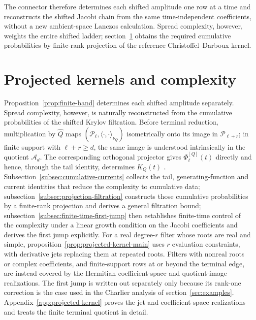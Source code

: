 \documentclass[a4paper,11pt]{article}
\theoremstyle{definition}
\theoremstyle{remark}
\newcommand{\cA}{\mathcal A}
\newcommand{\cP}{\mathcal P}
\newcommand{\Qhat}{\widehat Q}
\begin{document}
The connector therefore determines each shifted amplitude one row at a time and reconstructs the shifted Jacobi chain from the same time-independent coefficients, without a new ambient-space Lanczos calculation. Spread complexity, however, weights the entire shifted ladder; section~\ref{sec:kernels} obtains the required cumulative probabilities by finite-rank projection of the reference Christoffel--Darboux kernel.

\section{Projected kernels and complexity}
\label{sec:kernels}

Proposition~\ref{prop:finite-band} determines each shifted amplitude separately. Spread complexity, however, is naturally reconstructed from the cumulative probabilities of the shifted Krylov filtration. Before terminal reduction, multiplication by $\Qhat$ maps $(\cP_\ell,\langle\cdot,\cdot\rangle_{\nu_Q})$ isometrically onto its image in $\cP_{\ell+r}$; in finite support with $\ell+r\ge d$, the same image is understood intrinsically in the quotient $\cA_d$. The corresponding orthogonal projector gives $\Phi_\ell^{[Q]}(t)$ directly and hence, through the tail identity, determines $K_Q(t)$ \cite{SimonCDK}. Subsection~\ref{subsec:cumulative-currents} collects the tail, generating-function and current identities that reduce the complexity to cumulative data; subsection~\ref{subsec:projection-filtration} constructs those cumulative probabilities by a finite-rank projection and derives a general filtration bound; subsection~\ref{subsec:finite-time-first-jump} then establishes finite-time control of the complexity under a linear growth condition on the Jacobi coefficients and derives the first jump explicitly. For a real degree-$r$ filter whose roots are real and simple, proposition~\ref{prop:projected-kernel-main} uses $r$ evaluation constraints, with derivative jets replacing them at repeated roots. Filters with nonreal roots or complex coefficients, and finite-support rows at or beyond the terminal edge, are instead covered by the Hermitian coefficient-space and quotient-image realizations. The first jump is written out separately only because its rank-one correction is the case used in the Charlier analysis of section~\ref{sec:examples}. Appendix~\ref{app:projected-kernel} proves the jet and coefficient-space realizations and treats the finite terminal quotient in detail.
\end{document}
